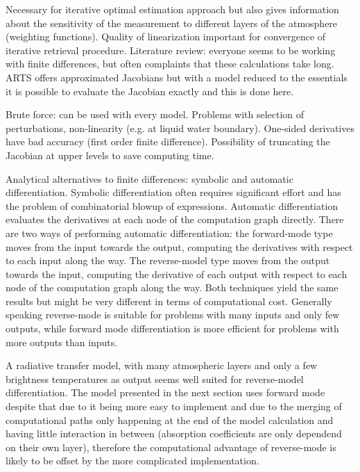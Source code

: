     \stopsubsection

    \startsubsection[title=Linearization,reference=ch:linearization]

        Necessary for iterative optimal estimation approach but also gives
        information about the sensitivity of the measurement to different layers of
        the atmosphere (weighting functions). Quality of linearization important
        for convergence of iterative retrieval procedure. Literature review:
        everyone seems to be working with finite differences, but often complaints
        that these calculations take long. ARTS offers approximated Jacobians
        but with a model reduced to the essentials it is possible to evaluate the
        Jacobian exactly and this is done here.

        Brute force: can be used with every model. Problems with selection of
        perturbations, non-linearity (e.g. at liquid water boundary). One-sided
        derivatives have bad accuracy (first order finite difference).
        Possibility of truncating the Jacobian at upper levels to save
        computing time.

        Analytical alternatives to finite differences: symbolic and automatic
        differentiation. Symbolic differentiation often requires significant
        effort and has the problem of combinatorial blowup of expressions.
        Automatic differentiation evaluates the derivatives at each node of
        the computation graph directly. There are two ways of performing
        automatic differentiation: the forward-mode type moves from the input
        towards the output, computing the derivatives with respect to each
        input along the way. The reverse-model type moves from the output
        towards the input, computing the derivative of each output with respect
        to each node of the computation graph along the way. Both techniques
        yield the same results but might be very different in terms of
        computational cost. Generally speaking reverse-mode is suitable for
        problems with many inputs and only few outputs, while forward mode
        differentiation is more efficient for problems with more outputs than
        inputs.

        A radiative transfer model, with many atmospheric layers and only
        a few brightness temperatures as output seems well suited for
        reverse-model differentiation. The model presented in the next section
        uses forward mode despite that due to it being more easy to implement
        and due to the merging of computational paths only happening at the end
        of the model calculation and having little interaction in between
        (absorption coefficients are only dependend on their own layer),
        therefore the computational advantage of reverse-mode is likely to be
        offset by the more complicated implementation.

